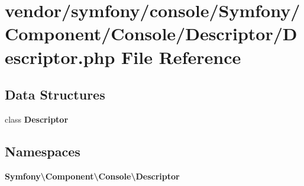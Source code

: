\section{vendor/symfony/console/\+Symfony/\+Component/\+Console/\+Descriptor/\+Descriptor.php File Reference}
\label{_descriptor_8php}
\subsection*{Data Structures}
\begin{DoxyCompactItemize}
\item 
class {\bf Descriptor}
\end{DoxyCompactItemize}
\subsection*{Namespaces}
\begin{DoxyCompactItemize}
\item 
 {\bf Symfony\textbackslash{}\+Component\textbackslash{}\+Console\textbackslash{}\+Descriptor}
\end{DoxyCompactItemize}
